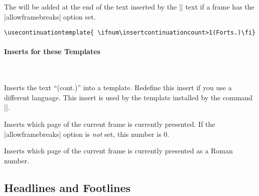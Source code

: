 \begin{command}{\usecontinuationtemplate{}}
  The  will be added at the end of the text inserted by
  the |\insertframetitle| text if a frame has the |allowframebreaks| option
  set. 
  \example
\begin{verbatim}
\usecontinuationtemplate{ \ifnum\insertcontinuationcount>1(Forts.)\fi}
\end{verbatim}
\end{command}



\paragraph{Inserts for these Templates}\ 



\begin{command}{\insertcontinuationtext}
  Inserts the text ``(cont.)'' into a template. Redefine this insert
  if you use a different language. This insert is used by the template
  installed by the command |\beamertemplatecontinuationtext|.
\end{command}

\begin{command}{\insertcontinuationcount}
  Inserts which page of the current frame is currently presented. If
  the |allowframebreaks| option is \emph{not} set, this number is 0.
\end{command}

\begin{command}{\insertcontinuationcountroman}
  Inserts which page of the current frame is currently presented as a
  Roman number.
\end{command}



\subsection{Headlines and Footlines}

